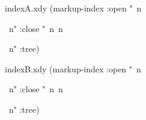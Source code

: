  
 

\begin{filecontents*}{indexA.xdy}
(markup-index :open  "~n
\begin{theindex}
  \providecommand*\lettergroupDefault[1]{}
  \providecommand*\lettergroup[1]{%
    \textsf{#1}
    \nopagebreak
  }
  ~n"
  :close "~n~n\end{theindex}~n"
:tree)
\end{filecontents*}

\begin{filecontents*}{indexB.xdy}
(markup-index :open  "~n
\begin{theindex}
  \providecommand*\lettergroupDefault[1]{}
  \providecommand*\lettergroup[1]{%
    \textit{#1}
    \nopagebreak
  }
  ~n"
  :close "~n~n\end{theindex}~n"
:tree)
\end{filecontents*}

  

